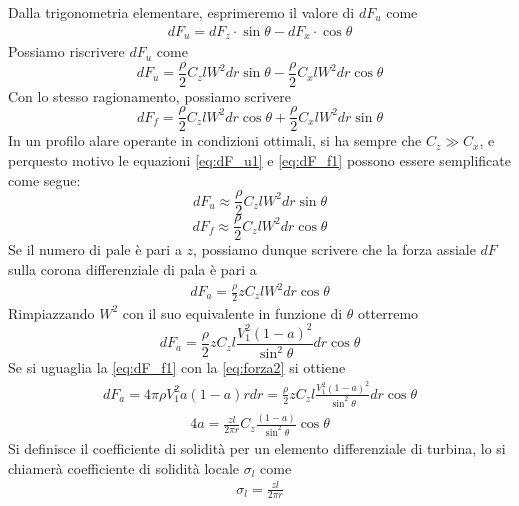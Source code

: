 Dalla trigonometria elementare, esprimeremo il valore di $dF_u$ come
\begin{align*}
dF_u = dF_z \cdot \sin \theta - dF_x \cdot \cos \theta
\end{align*}
Possiamo riscrivere $dF_u$ come
\begin{equation}\label{eq:dF_u1}
dF_u = \frac{\rho}{2} C_z l W^2 dr \sin \theta - \frac{\rho}{2} C_x l W^2 dr \cos \theta
\end{equation}
Con lo stesso ragionamento, possiamo scrivere
\begin{equation}\label{eq:dF_f1}
dF_f = \frac{\rho}{2} C_z l W^2 dr \cos \theta + \frac{\rho}{2} C_x l W^2 dr \sin \theta
\end{equation}
In un profilo alare operante in condizioni ottimali, si ha sempre che $C_z \gg C_x$, e perquesto motivo le equazioni \ref{eq:dF_u1} e \ref{eq:dF_f1} possono essere semplificate come segue:
\begin{equation}\label{eq:dF_u2}
dF_u \approx \frac{\rho}{2} C_zl W^2 dr \sin \theta
\end{equation}
\begin{equation}\label{eq:dF_f2}
dF_f \approx \frac{\rho}{2} C_zl W^2 dr \cos \theta
\end{equation}
Se il numero di pale è pari a $z$, possiamo dunque scrivere che la forza assiale $dF$ sulla corona differenziale di pala è pari a
\begin{align*}
dF_a = \frac{\rho}{2} z C_z l W^2 dr \cos \theta
\end{align*}
Rimpiazzando $W^2$ con il suo equivalente in funzione di $\theta$ otterremo
\begin{equation}
dF_a = \frac{\rho}{2} z C_z l \frac{V_1^2 \left( 1- a \right)^2}{\sin^2 \theta} dr \cos \theta
\end{equation}
Se si uguaglia la \ref{eq:dF_f1} con la \ref{eq:forza2} si ottiene
\begin{align*}
dF_a = 4 \pi \rho V_1^2 a \left( 1-a \right) r dr = \frac{\rho}{2} z C_z l \frac{V_1^2 \left( 1- a \right)^2 }{\sin^2 \theta} dr \cos \theta
\end{align*}
\begin{align*}
4 a = \frac{z l }{2 \pi r} C_z \frac{\left( 1- a \right)}{\sin^2 \theta} \cos \theta
\end{align*}
Si definisce il coefficiente di solidità per un elemento differenziale di turbina, lo si chiamerà coefficiente di solidità locale $\sigma_l$ come
\begin{align*}
\sigma_l = \frac{z l}{2 \pi r}
\end{align*}

